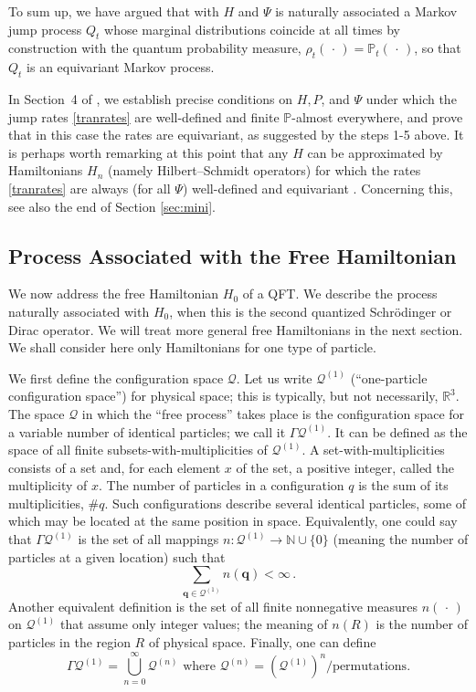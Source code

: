 \documentclass[12pt]{article}
\newcommand{\RRR}{\mathbb{R}} %
\newcommand{\NNN}{\mathbb{N}} %
\newcommand{\1}{\mathbf{1}} %
\newcommand{\conf}{\mathcal{Q}} %
\newcommand{\measure}{\mathbb{P}} %
\newcommand{\pov}{{P}}%
\newcommand{\vq}{{\boldsymbol q}}
\begin{document}
To sum up, we have argued that with $H$ and $\Psi$ is naturally
associated a Markov jump process $Q_t$ whose marginal distributions
coincide at all times by construction with the quantum probability
measure, $\rho_t(\,\cdot\,) = \measure_t(\,\cdot\,)$, so that $Q_t$ is
an equivariant Markov process.

In Section~4 of \cite{crea2A}, we establish precise conditions on
$H,\pov$, and $\Psi$ under which the jump rates \eqref{tranrates} are
well-defined and finite $\measure$-almost everywhere, and prove that
in this case the rates are equivariant, as suggested by the steps 1-5
above. It is perhaps worth remarking at this point that any $H$ can be
approximated by Hamiltonians $H_n$ (namely Hilbert--Schmidt operators)
for which the rates \eqref{tranrates} are always (for all $\Psi$)
well-defined and equivariant \cite{crea2A}. Concerning this, see also
the end of Section \ref{sec:mini}.



\subsection{Process Associated with the Free Hamiltonian}
\label{sec:free}

We now address the free Hamiltonian $H_0$ of a QFT.  We describe the
process naturally associated with $H_0$, when this is the second
quantized Schr\"odinger or Dirac operator.  We will treat more general
free Hamiltonians in the next section. We shall consider here only
Hamiltonians for one type of particle.

We first define the configuration space $\conf$.  Let us write
$\conf^{(1)}$ (``one-particle configuration space'') for physical
space; this is typically, but not necessarily, $\RRR^3$.  The space
$\conf$ in which the ``free process'' takes place is the configuration
space for a variable number of identical particles; we call it $\Gamma
\conf^{(1)}$.  It can be defined as the space of all finite
subsets-with-multiplicities of $\conf^{(1)}$.  A
set-with-multiplicities consists of a set and, for each element $x$ of
the set, a positive integer, called the multiplicity of $x$. The
number of particles in a configuration $q$ is the sum of its
multiplicities, $\#q$. Such configurations describe several identical
particles, some of which may be located at the same position in
space. Equivalently, one could say that $\Gamma \conf^{(1)}$ is the
set of all mappings $n:\conf^{(1)} \to \NNN\cup\{0\}$ (meaning the
number of particles at a given location) such that
\[
   \sum_{\vq \in \conf^{(1)}} n(\vq ) < \infty\,.
\]
Another equivalent definition is the set of all finite nonnegative
measures $n(\,\cdot\,)$ on $\conf^{(1)}$ that assume only integer
values; the meaning of $n(R)$ is the number of particles in the region
$R$ of physical space. Finally, one can define
\[
   \Gamma \conf^{(1)} = \bigcup_{n=0}^\infty \conf^{(n)} \mbox{ where }
   \conf^{(n)} = (\conf^{(1)})^n/\mbox{permutations}.
\]
\end{document}
